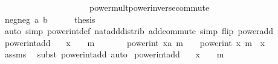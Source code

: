 \begin{isabellebody}
\ \ \ \ \ \ \ \ \ \ \ \ \ \ \ \ \ \ \ \ \ power{\isacharunderscore}{\kern0pt}mult{\isacharunderscore}{\kern0pt}power{\isacharunderscore}{\kern0pt}inverse{\isacharunderscore}{\kern0pt}commute{\isacharparenright}{\kern0pt}\ \ \ \ \isanewline
\ \ \isamarkupfalse%
\isanewline
\ \ \ \ \isamarkupfalse%
\ {\isacharparenleft}{\kern0pt}neg{\isacharunderscore}{\kern0pt}neg\ a\ b{\isacharparenright}{\kern0pt}\isanewline
\ \ \ \ \isamarkupfalse%
\ {\isacharquery}{\kern0pt}thesis\isanewline
\ \ \ \ \ \ \isamarkupfalse%
\ {\isacharparenleft}{\kern0pt}auto\ simp{\isacharcolon}{\kern0pt}\ power{\isacharunderscore}{\kern0pt}int{\isacharunderscore}{\kern0pt}def\ nat{\isacharunderscore}{\kern0pt}add{\isacharunderscore}{\kern0pt}distrib\ add{\isachardot}{\kern0pt}commute\ simp\ flip{\isacharcolon}{\kern0pt}\ power{\isacharunderscore}{\kern0pt}add{\isacharparenright}{\kern0pt}\isanewline
\ \ \isamarkupfalse%
\isanewline
{}\isamarkupfalse%
%
\endisatagproof
{\isafoldproof}%
%
\isadelimproof
\isanewline
%
\endisadelimproof
\isanewline
{}\isamarkupfalse%
\ power{\isacharunderscore}{\kern0pt}int{\isacharunderscore}{\kern0pt}add{\isacharunderscore}{\kern0pt}{}{\isacharcolon}{\kern0pt}\isanewline
\ \ \ {\isachardoublequoteopen}x\ {\isasymnoteq}\ {}\ {\isasymor}\ m\ {\isasymnoteq}\ {\isacharminus}{\kern0pt}{}{\isachardoublequoteclose}\isanewline
\ \ \ \ \ {\isachardoublequoteopen}power{\isacharunderscore}{\kern0pt}int\ {\isacharparenleft}{\kern0pt}x{\isacharcolon}{\kern0pt}{\isacharcolon}{\kern0pt}{\isacharprime}{\kern0pt}a{\isacharparenright}{\kern0pt}\ {\isacharparenleft}{\kern0pt}m\ {\isacharplus}{\kern0pt}\ {}{\isacharparenright}{\kern0pt}\ {\isacharequal}{\kern0pt}\ power{\isacharunderscore}{\kern0pt}int\ x\ m\ {\isacharasterisk}{\kern0pt}\ x{\isachardoublequoteclose}\isanewline
%
\isadelimproof
\ \ %
\endisadelimproof
%
\isatagproof
{}\isamarkupfalse%
\ assms\ \isamarkupfalse%
\ {\isacharparenleft}{\kern0pt}subst\ power{\isacharunderscore}{\kern0pt}int{\isacharunderscore}{\kern0pt}add{\isacharparenright}{\kern0pt}\ auto%
\endisatagproof
{\isafoldproof}%
%
\isadelimproof
\isanewline
%
\endisadelimproof
\isanewline
{}\isamarkupfalse%
\ power{\isacharunderscore}{\kern0pt}int{\isacharunderscore}{\kern0pt}add{\isacharunderscore}{\kern0pt}{}{\isacharprime}{\kern0pt}{\isacharcolon}{\kern0pt}\isanewline
\ \ \ {\isachardoublequoteopen}x\ {\isasymnoteq}\ {}\ {\isasymor}\ m\ {\isasymnoteq}\ {\isacharminus}{\kern0pt}{}{\isachardoublequoteclose}\isanewline

\end{isabellebody}
